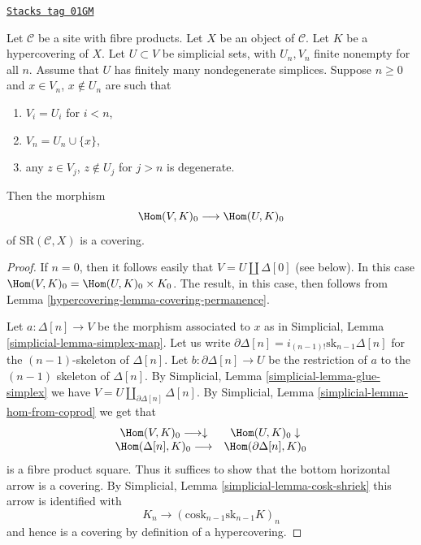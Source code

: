 \begin{lemma}
\label{hypercovering-lemma-one-more-simplex}
\href{https://stacks.math.columbia.edu/tag/01GM}{\texttt{Stacks tag 01GM}}

Let $\mathcal{C}$ be a site with fibre products.
Let $X$ be an object of $\mathcal{C}$.
Let $K$ be a hypercovering of $X$.
Let $U \subset V$ be simplicial sets, with $U_n, V_n$
finite nonempty for all $n$.
Assume that $U$ has finitely many nondegenerate simplices.
Suppose $n \geq 0$ and $x \in V_n$,
$x \not \in U_n$ are such that
\begin{enumerate}
\item $V_i = U_i$ for $i < n$,
\item $V_n = U_n \cup \{x\}$,
\item any $z \in V_j$, $z \not \in U_j$ for $j > n$
is degenerate.
\end{enumerate}
Then the morphism
$$
\Hom(V, K)_0
\longrightarrow
\Hom(U, K)_0
$$
of $\text{SR}(\mathcal{C}, X)$ is a covering.
\end{lemma}

\begin{proof}

If $n = 0$, then it follows easily that $V = U \amalg \Delta[0]$
(see below). In this case $\Hom(V, K)_0 =
\Hom(U, K)_0 \times K_0$. The result, in this case, then follows
from Lemma \ref{hypercovering-lemma-covering-permanence}.

\medskip\noindent
Let $a : \Delta[n] \to V$ be the morphism associated to $x$
as in Simplicial, Lemma \ref{simplicial-lemma-simplex-map}.
Let us write $\partial \Delta[n] = i_{(n-1)!} \text{sk}_{n - 1} \Delta[n]$
for the $(n - 1)$-skeleton of $\Delta[n]$.
Let $b : \partial \Delta[n] \to U$ be the restriction
of $a$ to the $(n - 1)$ skeleton of $\Delta[n]$. By
Simplicial, Lemma \ref{simplicial-lemma-glue-simplex}
we have $V = U \amalg_{\partial \Delta[n]} \Delta[n]$. By
Simplicial, Lemma
\ref{simplicial-lemma-hom-from-coprod}
we get that
$$
\begin{array}{cc}\Hom(V, K)_0 \longrightarrow\downarrow & \Hom(U, K)_0 \downarrow \\ \Hom(\Delta[n], K)_0 \longrightarrow & \Hom(\partial \Delta[n], K)_0\end{array}
$$
is a fibre product square. Thus it suffices to show that
the bottom horizontal arrow is a covering. By
Simplicial, Lemma \ref{simplicial-lemma-cosk-shriek}
this arrow is identified with
$$
K_n \to (\text{cosk}_{n - 1} \text{sk}_{n - 1} K)_n
$$
and hence is a covering by definition of a hypercovering.
\end{proof}

